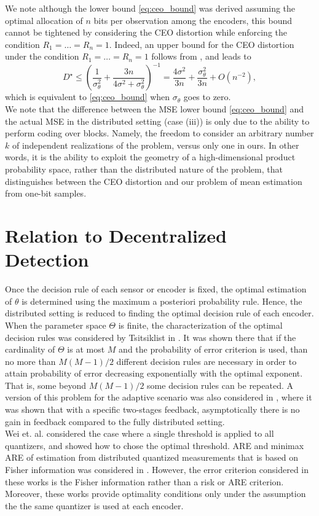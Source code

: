 \documentclass[letterpaper, conference]{IEEEtran}      %
\begin{document}
We note although the lower bound \eqref{eq:ceo_bound} was derived assuming the optimal allocation of $n$ bits per observation among the encoders, this bound cannot be tightened by considering the CEO distortion while enforcing the condition $R_1=\ldots = R_n = 1$. Indeed, an upper bound for the CEO distortion under the condition $R_1=\ldots = R_n = 1$ follows from \cite{KipnisRini2017}, and leads to
\[
D^\star \leq  \left( \frac{1}{\sigma_\theta^2} +  \frac{3n}{4\sigma^2 + \sigma_\theta^2} \right)^{-1}   =
\frac{4 \sigma^2}{3n} +  \frac{\sigma_\theta^2}{3n} + O(n^{-2}),
\]
which is equivalent to \eqref{eq:ceo_bound} when $\sigma_\theta$ goes to zero. \\

We note that the difference between the MSE lower bound \eqref{eq:ceo_bound} and the actual MSE in the distributed setting (case (iii)) is only due to the ability to perform coding over blocks. Namely, the freedom to consider an arbitrary number $k$ of independent realizations of the problem, versus only one in ours. In other words, it is the ability to exploit the geometry of a high-dimensional product probability space, rather than the distributed nature of the problem, that distinguishes between the CEO distortion and our problem of mean estimation from one-bit samples.

\section{Relation to Decentralized Detection}
Once the decision rule of each sensor or encoder is fixed, the optimal estimation of $\theta$ is determined using the maximum a posteriori probability rule. Hence, the distributed setting is reduced to finding the optimal decision rule of each encoder. When the parameter space $\Theta$ is finite, the characterization of the optimal decision rules was considered by Tsitsiklist in \cite{tsitsiklis1988decentralized}. It was shown there that if the cardinality of $\Theta$ is at most $M$ and the probability of error criterion is used, than no more than $M(M-1)/2$ different decision rules are necessary in order to attain probability of error decreasing exponentially with the optimal exponent. That is, some beyond $M(M-1)/2$ some decision rules can be repeated. A version of this problem for the adaptive scenario was also considered in \cite{5751320}, where it was shown that with a specific two-stages feedback, asymptotically there is no gain in feedback compared to the fully distributed setting. 
 \\
Wei et. al. \cite{904560} considered the case where a single threshold is applied to all quantizers, and showed how to chose the optimal threshold. ARE and minimax ARE of estimation from distributed quantized measurements that is based on Fisher information was considered in \cite{4244748, 6882252, chen2010performance, 5184907}. However, the error criterion considered in these works is the Fisher information rather than a risk or ARE criterion. Moreover, these works provide optimality conditions only under the assumption the the same quantizer is used at each encoder. 
\end{document}
